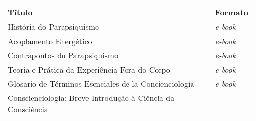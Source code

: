 \documentclass{gescons}
\begin{document}
\begin{longtable}[]{@{}
  >{\raggedright\arraybackslash}p{}
  >{\raggedright\arraybackslash}p{}@{}}
\toprule\noalign{}
\begin{minipage}[b]{\linewidth}\centering
\textbf{Título}
\end{minipage} & \begin{minipage}[b]{\linewidth}\centering
\textbf{Formato}
\end{minipage} \\
\hline
\begin{minipage}[b]{\linewidth}\raggedright
História do Parapsiquismo
\end{minipage} & \begin{minipage}[b]{\linewidth}\raggedright
\emph{e-book}
\end{minipage} \\
\hline
\begin{minipage}[b]{\linewidth}\raggedright
Acoplamento Energético
\end{minipage} & \begin{minipage}[b]{\linewidth}\raggedright
\emph{e-book}
\end{minipage} \\
\hline
\begin{minipage}[b]{\linewidth}\raggedright
Contrapontos do Parapsiquismo
\end{minipage} & \begin{minipage}[b]{\linewidth}\raggedright
\emph{e-book}
\end{minipage} \\
\hline
\begin{minipage}[b]{\linewidth}\raggedright
Teoria e Prática da Experiência Fora do Corpo
\end{minipage} & \begin{minipage}[b]{\linewidth}\raggedright
\emph{e-book}
\end{minipage} \\
\hline
\begin{minipage}[b]{\linewidth}\raggedright
Glosario de Términos Esenciales de la Concienciología
\end{minipage} & \begin{minipage}[b]{\linewidth}\raggedright
\emph{e-book}
\end{minipage} \\
\hline
\begin{minipage}[b]{\linewidth}\raggedright
Conscienciologia: Breve Introdução à Ciência da Consciência

\end{minipage}
\end{longtable}
\end{document}

